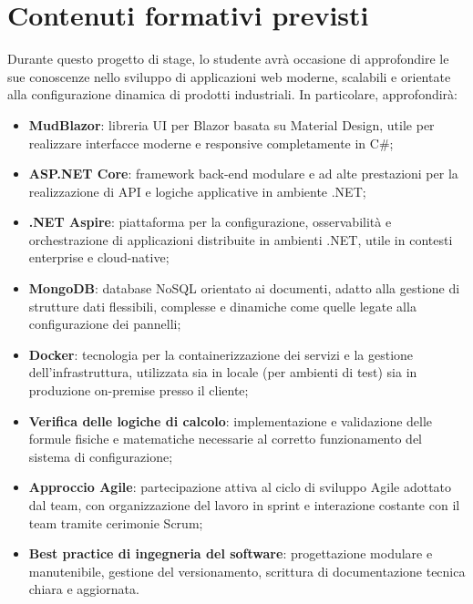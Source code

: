 \section*{Contenuti formativi previsti}

Durante questo progetto di stage, lo studente avrà occasione di approfondire le sue conoscenze nello sviluppo di applicazioni web moderne, scalabili e orientate alla configurazione dinamica di prodotti industriali. In particolare, approfondirà:

\begin{itemize}
    \item \textbf{MudBlazor}: libreria UI per Blazor basata su Material Design, utile per realizzare interfacce moderne e responsive completamente in C\#;
    
    \item \textbf{ASP.NET Core}: framework back-end modulare e ad alte prestazioni per la realizzazione di API e logiche applicative in ambiente .NET;
    
    \item \textbf{.NET Aspire}: piattaforma per la configurazione, osservabilità e orchestrazione di applicazioni distribuite in ambienti .NET, utile in contesti enterprise e cloud-native;
    
    \item \textbf{MongoDB}: database NoSQL orientato ai documenti, adatto alla gestione di strutture dati flessibili, complesse e dinamiche come quelle legate alla configurazione dei pannelli;
    
    \item \textbf{Docker}: tecnologia per la containerizzazione dei servizi e la gestione dell’infrastruttura, utilizzata sia in locale (per ambienti di test) sia in produzione on-premise presso il cliente;
    
    \item \textbf{Verifica delle logiche di calcolo}: implementazione e validazione delle formule fisiche e matematiche necessarie al corretto funzionamento del sistema di configurazione;
    
    \item \textbf{Approccio Agile}: partecipazione attiva al ciclo di sviluppo Agile adottato dal team, con organizzazione del lavoro in sprint e interazione costante con il team tramite cerimonie Scrum;
    
    \item \textbf{Best practice di ingegneria del software}: progettazione modulare e manutenibile, gestione del versionamento, scrittura di documentazione tecnica chiara e aggiornata.
\end{itemize}

\newpage
